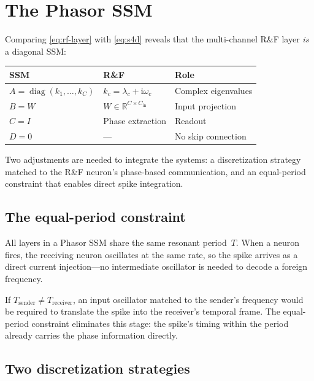\documentclass[11pt]{article}
\newcommand{\R}{\mathbb{R}}
\newcommand{\im}{\mathrm{i}}
\theoremstyle{definition}
\begin{document}
\section{The Phasor SSM}\label{sec:phasor-ssm}

Comparing \eqref{eq:rf-layer} with \eqref{eq:s4d} reveals that the
multi-channel R\&F layer \emph{is} a diagonal SSM:

\begin{center}
\begin{tabular}{lll}
\toprule
SSM & R\&F & Role \\
\midrule
$A = \operatorname{diag}(k_1,\dots,k_C)$ &
  $k_c = \lambda_c + \im\omega_c$ & Complex eigenvalues \\
$B = W$ & $W\in\R^{C\times C_{\mathrm{in}}}$ & Input projection \\
$C = I$ & Phase extraction & Readout \\
$D = 0$ & --- & No skip connection \\
\bottomrule
\end{tabular}
\end{center}

Two adjustments are needed to integrate the systems: a
discretization strategy matched to the R\&F neuron's phase-based
communication, and an equal-period constraint that enables direct
spike integration.

\subsection{The equal-period constraint}\label{sec:equal-period}

All layers in a Phasor SSM share the same resonant period~$T$.
When a neuron fires, the receiving neuron oscillates at the same rate,
so the spike arrives as a direct current injection---no intermediate
oscillator is needed to decode a foreign frequency.

If $T_{\text{sender}} \neq T_{\text{receiver}}$, an input oscillator
matched to the sender's frequency would be required to translate the
spike into the receiver's temporal frame. The equal-period constraint
eliminates this stage: the spike's timing within the period already
carries the phase information directly.

\subsection{Two discretization strategies}\label{sec:discretization}
\end{document}
